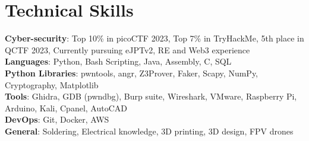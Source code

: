 \section{Technical Skills}

\begin{itemize}[leftmargin=0.15in, label={}]
    \small{\item{
        \textbf{Cyber-security}{: Top 10\% in picoCTF 2023, Top 7\% in TryHackMe, 5th place in QCTF 2023, Currently pursuing eJPTv2, RE and Web3 experience} \\ \vspace{2mm}
        \textbf{Languages}{: Python, Bash Scripting, Java, Assembly, C, SQL} \\ \vspace{2mm}
        \textbf{Python Libraries}{: pwntools, angr, Z3Prover, Faker, Scapy, NumPy, Cryptography, Matplotlib} \\ \vspace{2mm}
        \textbf{Tools}{: Ghidra, GDB (pwndbg), Burp suite, Wireshark, VMware, Raspberry Pi, Arduino, Kali, Cpanel, AutoCAD} \\ \vspace{2mm}
        \textbf{DevOps}{: Git, Docker, AWS}\\ \vspace{2mm}
        \textbf{General}{: Soldering, Electrical knowledge, 3D printing, 3D design, FPV drones}\\

    }}
\end{itemize}